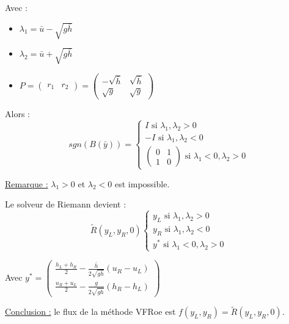\documentclass{article}
\begin{document}
Avec :
\begin{itemize}
    \item $\lambda_1 = \bar{u} - \sqrt{g \bar{h}}$
    \item $\lambda_2 = \bar{u} + \sqrt{g \bar{h}}$
    \item $P = \begin{pmatrix} r_1 & r_2 \end{pmatrix} = \begin{pmatrix} -\sqrt{\bar{h}} & \sqrt{\bar{h}} \\ \sqrt{g} & \sqrt{g} \end{pmatrix}$
\end{itemize}

Alors :
\[ sgn(B(\bar{y})) = \left\{ \begin{matrix}
        I \text{ si } \lambda_1, \lambda_2 > 0 \\
        -I \text{ si } \lambda_1, \lambda_2 < 0 \\
        \begin{pmatrix} 0 & 1 \\ 1 & 0 \end{pmatrix} \text{ si } \lambda_1 < 0, \lambda_2 > 0
\end{matrix} \right. \]

\underline{Remarque :} $\lambda_1 > 0$ et $\lambda_2 < 0$ est impossible.
\newline

Le solveur de Riemann devient :
\[ \tilde{R}(y_L, y_R, 0) \left\{ \begin{matrix} 
        y_L \text{ si } \lambda_1, \lambda_2 > 0 \\
        y_R \text{ si } \lambda_1, \lambda_2 < 0 \\
        y^* \text{ si } \lambda_1 < 0, \lambda_2 > 0
\end{matrix} \right. \]

Avec  $y^* = \begin{pmatrix} \frac{h_L+h_R}{2} - \frac{\bar{h}}{2 \sqrt{g \bar{h}}} (u_R-u_L) \\ \frac{u_R+u_L}{2} - \frac{g}{2 \sqrt{g \bar{h}}} (h_R-h_L) \end{pmatrix}$
\newline

\underline{Conclusion :} le flux de la méthode VFRoe est $f(y_L, y_R) = \tilde{R}(y_L, y_R, 0)$.
\end{document}
